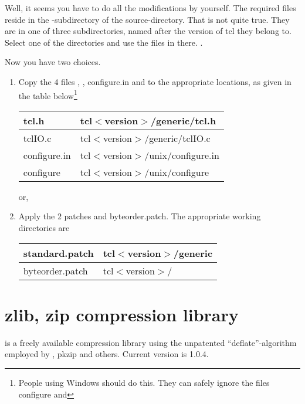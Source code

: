 Well, it seems you have to do all the modifications by yourself. The
required files reside in the -subdirectory of the
source-directory. That is not quite true. They are in one of three
subdirectories, named after the version of tcl they belong to. Select
one of the directories and use the files in there. .

Now you have two choices.

\begin {enumerate}
\item	Copy the 4 files , , \file
	{configure.in} and  to the appropriate
	locations, as given in the table below\footnote {People using
	Windows\tm{} should do this. They can safely ignore the files \file
	{configure} and }

	\begin {tabular} {|l|l|} \hline
	tcl.h		& tcl$<$version$>$/generic/tcl.h	\\ \hline
	tclIO.c		& tcl$<$version$>$/generic/tclIO.c	\\ \hline
	configure.in	& tcl$<$version$>$/unix/configure.in	\\ \hline
	configure	& tcl$<$version$>$/unix/configure	\\ \hline
	\end {tabular}

	or,

\item	Apply the 2 patches  and \file
	{byteorder.patch}. The appropriate working directories are

	\begin {tabular} {|l|l|} \hline
	standard.patch	& tcl$<$version$>$/generic	\\ \hline
	byteorder.patch	& tcl$<$version$>$/		\\ \hline
	\end {tabular}
\end   {enumerate}


\chapter {zlib, zip compression library}\label{zlib}

 is a freely available compression library using the
unpatented ``deflate''-algorithm employed by , \cmd
{pkzip} and others. Current version is 1.0.4.


